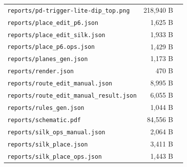 \documentclass[11pt,a4paper]{article}
\begin{document}
{\begin{longtable}{p{9cm}rp{4cm}}
\texttt{reports/pd-trigger-lite-dip\_top.png} & 218,940 B &  \\
\texttt{reports/place\_edit\_p6.json} & 1,625 B &  \\
\texttt{reports/place\_edit\_silk.json} & 1,933 B &  \\
\texttt{reports/place\_p6.ops.json} & 1,429 B &  \\
\texttt{reports/planes\_gen.json} & 1,173 B &  \\
\texttt{reports/render.json} & 470 B &  \\
\texttt{reports/route\_edit\_manual.json} & 8,995 B &  \\
\texttt{reports/route\_edit\_manual\_result.json} & 6,055 B &  \\
\texttt{reports/rules\_gen.json} & 1,044 B &  \\
\texttt{reports/schematic.pdf} & 84,556 B &  \\
\texttt{reports/silk\_ops\_manual.json} & 2,064 B &  \\
\texttt{reports/silk\_place.json} & 3,411 B &  \\
\texttt{reports/silk\_place\_ops.json} & 1,443 B &  \\
\bottomrule
\end{longtable}
}
\end{document}
